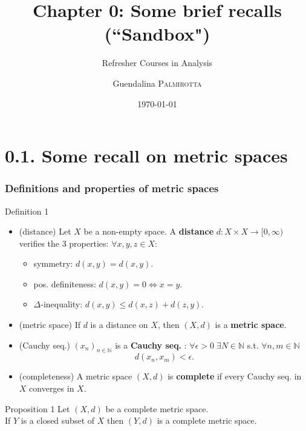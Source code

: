 \documentclass[10pt]{beamer}
\title[Refresher Courses in Analysis] %
{Chapter 0: Some brief recalls (``Sandbox")}
\subtitle{Refresher Courses in Analysis}
\author[Guendalina \textsc{Palmirotta}]{Guendalina \textsc{Palmirotta}}
\institute[]{University of Luxembourg, Department of Mathematics}
\date[]{\today}
\newcommand{\N}{\mathbb{N}}
\newcommand{\nologo}{\setbeamertemplate{logo}{}}
\begin{document}
\begin{frame}
\titlepage
\end{frame}

{\nologo



\section{0.1.  Some recall on metric spaces}

\begin{frame}
\frametitle{Definitions and properties of metric spaces}
\begin{alertblock}{Definition 1}
\begin{itemize}
\item (distance) Let $X$ be a non-empty space.
A \textbf{distance} $d: X \times X \rightarrow [0, \infty)$ verifies the 3 properties: $\forall x,y,z \in X$:
\begin{itemize}
\item[(i)] symmetry: $d(x,y)=d(x,y)$.
\item[(ii)] pos.  definiteness: $d(x,y)=0 \iff x=y$.
\item[(iii)] $\Delta$-inequality: $d(x,y) \leq d(x,z)+d(z,y).$
\end{itemize}
\item (metric space) If $d$ is a distance on $X$, then $(X,d)$ is a \textbf{metric space}.
\item (Cauchy seq.) $(x_n)_{n\in \N}$ is a \textbf{Cauchy seq. }:
$\forall \epsilon >0 \;\exists N \in \N$ s.t.  $\forall n,m \in \N$
$$d(x_n,x_m) < \epsilon.$$
\item (completeness) A metric space $(X,d)$ is \textbf{complete} if every Cauchy seq. in $X$ converges in $X$.
\end{itemize}
\end{alertblock}
\vspace{0.2cm}
\begin{block}{Proposition 1}
Let $(X,d)$ be a complete metric space.\\
If $Y$ is a closed subset of $X$ then $(Y,d)$ is a complete metric space.
\end{block}
\end{frame}



}
\end{document}
